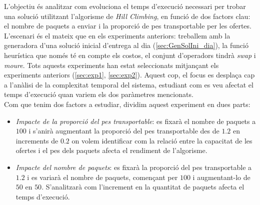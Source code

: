 \documentclass[a4paper]{article}
\begin{document}
	L'objectiu és analitzar com evoluciona el temps d'execució necessari per trobar una solució utilitzant l'algorisme de \textit{Hill Climbing}, en funció de dos factors clau: el nombre de paquets a enviar i la proporció de pes transportable per les ofertes. \\
	
	L'escenari és el mateix que en els experiments anteriors: treballem amb la generadora d'una solució inicial d'entrega al dia (\ref{sec:GenSolIni_dia}), la funció heurística que només té en compte els costos, el conjunt d'operadors tindrà \textit{swap} i \textit{moure}. Tots aquests experiments han estat seleccionats mitjançant els experiments anteriors (\ref{sec:exp1}, \ref{sec:exp2}). Aquest cop, el focus es desplaça cap a l'anàlisi de la complexitat temporal del sistema, estudiant com es veu afectat el temps d'execució quan variem els dos paràmetres mencionats. \\
	
	Com que tenim dos factors a estudiar, dividim aquest experiment en dues parts:
	
	\begin{itemize}
		\item \emph{Impacte de la proporció del pes transportable}: es fixarà el nombre de paquets a $100$ i s'anirà augmentant la proporció del pes transportable des de $1.2$ en increments de $0.2$ on volem identificar com la relació entre la capacitat de les ofertes i el pes dels paquets afecta el rendiment de l'algorisme.
		
		\item \emph{Impacte del nombre de paquets}: es fixarà la proporció del pes transportable a $1.2$ i es variarà el nombre de paquets, començant per $100$ i augmentant-lo de $50$ en $50$. S'analitzarà com l'increment en la quantitat de paquets afecta el temps d'execució.
		
	\end{itemize}
	
\end{document}
